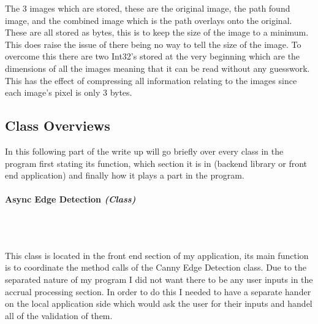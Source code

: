 \begin{FlushLeft}
    The 3 images which are stored, these are the original image, the path found image, and the combined image which is the path overlays onto the original. These are all stored as bytes, this is to keep the size of the image to a minimum. This does raise the issue of there being no way to tell the size of the image. To overcome this there are two Int32's stored at the very beginning which are the dimensions of all the images meaning that it can be read without any guesswork. This has the effect of compressing all information relating to the images since each image's pixel is only 3 bytes. \\ 

    \subsection{Class Overviews}

    In this following part of the write up will go briefly over every class in the program first stating its function, which section it is in (backend library or front end application) and finally how it plays a part in the program.

    \paragraph{Async Edge Detection \textit{(Class)}} \mbox{} \\

    \begin{figure}[H]
        \centering
    \end{figure}\\

    This class is located in the front end section of my application, its main function is to coordinate the method calls of the Canny Edge Detection class. Due to the separated nature of my program I did not want there to be any user inputs in the accrual processing section. In order to do this I needed to have a separate hander on the local application side which would ask the user for their inputs and handel all of the validation of them. \\ \bk


\end{FlushLeft}
